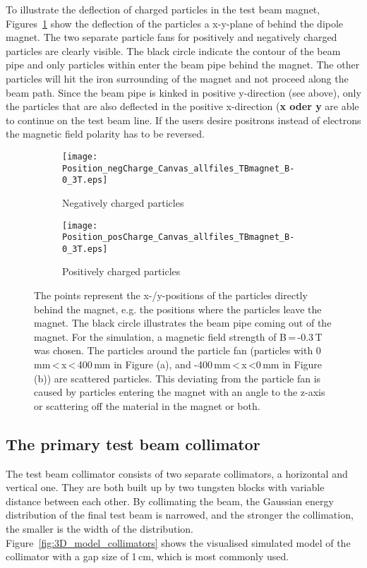To illustrate the deflection of charged particles in the test beam magnet, 
Figures~\ref{fig:deflection_plot_neg/pos} show the deflection of the particles a
x-y-plane of behind the dipole magnet. The two 
separate particle fans for positively and negatively charged particles are 
clearly visible. The black circle indicate the contour of the beam pipe and only particles within
enter the beam pipe behind the magnet. The other particles will hit 
the iron surrounding of the magnet and not proceed along the beam path. Since the 
beam pipe is kinked in positive y-direction (see above), only the 
particles that are also deflected in the positive x-direction ({\bfseries x oder y} are able to 
continue on the test beam line. If the users desire positrons instead of electrons  the magnetic field 
polarity has to be reversed. 


\begin{figure}[H]
  \centering
  \begin{subfigure}[t]{0.49\textwidth}
    \texttt{[image: Position\_negCharge\_Canvas\_allfiles\_TBmagnet\_B-0\_3T.eps]}
      \caption{Negatively charged particles}
  \end{subfigure}
\hfill
  \begin{subfigure}[t]{0.49\textwidth}
    \texttt{[image: Position\_posCharge\_Canvas\_allfiles\_TBmagnet\_B-0\_3T.eps]}
      \caption{Positively charged particles}
  \end{subfigure}
 \caption[Position plots for negatively/positively charged particles behind the test beam magnet.]{The points represent the x-/y-positions of the particles directly behind the magnet, e.g. the positions where the particles leave the magnet. The black circle illustrates the beam pipe coming out of the magnet. For the simulation, a magnetic field strength of B\,=\,-0.3\,T was chosen. The particles around the particle fan (particles with 0\,mm\,<\,x\,<\,400\,mm in Figure (a), and -400\,mm\,<\,x\,<0\,mm in Figure (b)) are scattered particles. This deviating from the particle fan is caused by particles entering the magnet with an angle to the z-axis or scattering off the material in the magnet or both.}
  \label{fig:deflection_plot_neg/pos}
\end{figure}

\subsection{The primary test beam collimator}

The test beam collimator consists of two separate collimators, a horizontal and 
vertical one. They are both built up by two tungsten blocks with variable 
distance between each other. By collimating the beam, the Gaussian energy 
distribution of the final test beam is narrowed, and the stronger the 
collimation, the smaller is the width of the distribution.\\
Figure~\ref{fig:3D_model_collimators} shows the visualised simulated model of 
the collimator with a gap size of 1\,cm, which is most commonly used.

